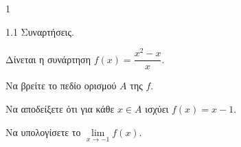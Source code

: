 \begin{ylh}{1}
    \item 1.1 Συναρτήσεις.
\end{ylh}
Δίνεται η συνάρτηση $f(x) = \dfrac{x^2-x}{x}$.
\begin{alist}
    \item Να βρείτε το πεδίο ορισμού $A$ της $f$. 
    \item Να αποδείξετε ότι για κάθε $x \in A$ ισχύει $f(x) = x - 1$. 
    \item Να υπολογίσετε το $\displaystyle\lim\limits_{x\to-1} f(x)$. 
\end{alist}

